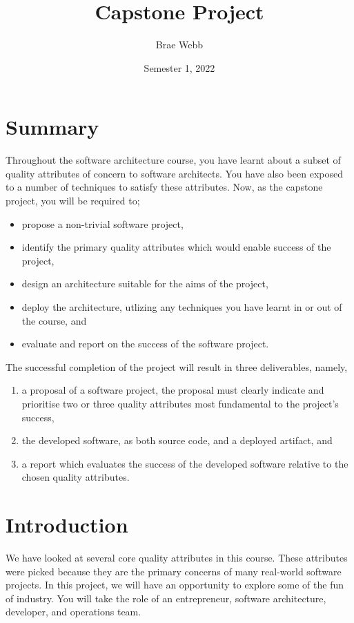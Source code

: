 \documentclass{csse4400}
\title{Capstone Project}
\author{Brae Webb}
\date{Semester 1, 2022}
\begin{document}
\maketitle

\section*{Summary}
Throughout the software architecture course,
you have learnt about a subset of quality attributes of concern to software architects.
You have also been exposed to a number of techniques to satisfy these attributes.
Now, as the capstone project, you will be required to;
\begin{itemize}
    \item propose a non-trivial software project,
    \item identify the primary quality attributes which would enable success of the project,
    \item design an architecture suitable for the aims of the project,
    \item deploy the architecture, utlizing any techniques you have learnt in or out of the course, and
    \item evaluate and report on the success of the software project.
\end{itemize}

\noindent
The successful completion of the project will result in three deliverables, namely,
\begin{enumerate}[label=\roman*]
    \item a proposal of a software project, the proposal must clearly indicate and prioritise two or three quality attributes most {\color{red} fundamental} to the project's success,
    \item the developed software, as both source code, and a deployed artifact, and
    \item a report which evaluates the success of the developed software relative to the chosen quality attributes.
\end{enumerate}

\section{Introduction}
We have looked at several core quality attributes in this course.
These attributes were picked because they are the primary concerns of many real-world software projects.
In this project, we will have an opportunity to explore some of the fun of industry.
You will take the role of an entrepreneur, software architecture, developer, and operations team.
\end{document}
